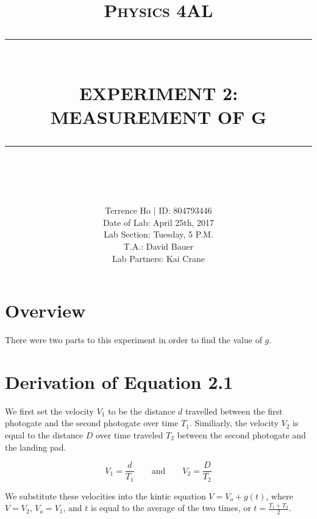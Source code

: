 \documentclass[11pt]{report}
\newcommand{\HRule}[1]{\rule{\linewidth}{#1}}
\begin{document}
\title{ \normalsize \textsc{Physics 4AL}
        \\ [2.0cm]
        \HRule{0.5pt} \\
        \LARGE \textbf{\uppercase{Experiment 2: Measurement of g}}
        \HRule{2pt} \\ [0.5cm]
        \vspace*{2\baselineskip}}

\date{}

\author{
        Terrence Ho | ID: 804793446 \\ 
        Date of Lab: April 25th, 2017 \\
        Lab Section: Tuesday, 5 P.M.\\
        T.A.: David Bauer\\
        Lab Partners: Kai Crane}

\maketitle
\tableofcontents
\newpage

\sectionfont{\scshape}

\section*{Overview}
There were two parts to this experiment in order to find the value of \(g\).  

\section*{Derivation of Equation 2.1}

\indent We first set the velocity \(V_1\) to be the distance \(d\) travelled between 
the first photogate and the second photogate over time \(T_1\).
Similiarly, the velocity \(V_2\) is equal to the distance \(D\) over time 
traveled \(T_2\) between the second photogate and the landing pad.

\[ V_1 = \frac{d}{T_1}   \qquad\text{and}\qquad     V_2 = \frac{D}{T_2} \]

We substitute these velocities into the kintic equation \(V = V_o + g(t) \),
where \(V = V_2\), \(V_o = V_1\), and \(t\) is equal to the average of the two
times, or \(t = \frac{T_1 + T_2}{2} \).
\end{document}
